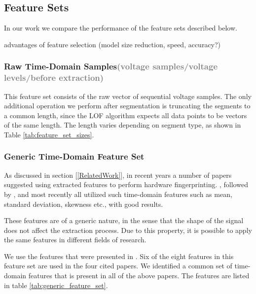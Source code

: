 \documentclass[conference]{IEEEtran}
\begin{document}
\subsection{Feature Sets}
  In our work we compare the performance of the feature sets described below.
  
  \color{gray}
  advantages of feature selection (model size reduction, speed, accuracy?)
  \color{black}
  
\subsubsection{Raw Time-Domain Samples\textcolor{gray}{(voltage samples/voltage levels/before extraction)}}

  This feature set consists of the raw vector of sequential voltage samples. The only additional operation we perform after segmentation is truncating the segments to a common length, since the LOF algorithm expects all data points to be vectors of the same length. The length varies depending on segment type, as shown in Table \ref{tab:feature_set_sizes}.
  
\subsubsection{Generic Time-Domain Feature Set}
  As discussed in section [\ref{RelatedWork}], in recent years a number of papers suggested using extracted features to perform hardware fingerprinting. \cite{dey2014accelprint}, followed by \cite{choi2018identifying}, \cite{choi2018voltageids} and most recently \cite{kneib2018scission} all utilized such time-domain features such as mean, standard deviation, skewness etc., with good results.
  
  These features are of a generic nature, in the sense that the shape of the signal does not affect the extraction process. Due to this property, it is possible to apply the same features in different fields of research.
  
  We use the features that were presented in \cite{kneib2018scission}. Six of the eight features in this feature set are used in the four cited papers.
  We identified a common set of time-domain features that is present in all of the above papers. The features are listed in table \ref{tab:generic_feature_set}.
  
\end{document}
